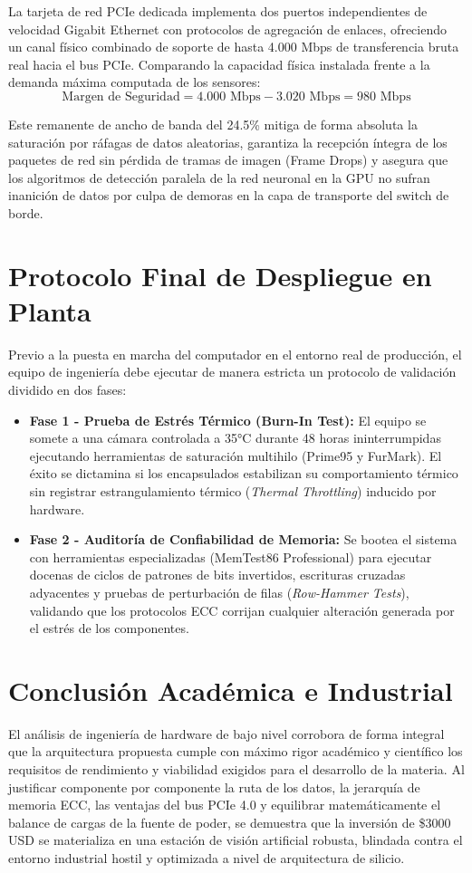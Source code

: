 \documentclass[12pt,letterpaper]{article}
\begin{document}
La tarjeta de red PCIe dedicada implementa dos puertos independientes de velocidad Gigabit Ethernet con protocolos de agregación de enlaces, ofreciendo un canal físico combinado de soporte de hasta 4.000 Mbps de transferencia bruta real hacia el bus PCIe. Comparando la capacidad física instalada frente a la demanda máxima computada de los sensores:
\begin{equation}
\text{Margen de Seguridad} = 4.000 \text{ Mbps} - 3.020 \text{ Mbps} = 980 \text{ Mbps}
\end{equation}

Este remanente de ancho de banda del 24.5\% mitiga de forma absoluta la saturación por ráfagas de datos aleatorias, garantiza la recepción íntegra de los paquetes de red sin pérdida de tramas de imagen (Frame Drops) y asegura que los algoritmos de detección paralela de la red neuronal en la GPU no sufran inanición de datos por culpa de demoras en la capa de transporte del switch de borde.

\section{Protocolo Final de Despliegue en Planta}
Previo a la puesta en marcha del computador en el entorno real de producción, el equipo de ingeniería debe ejecutar de manera estricta un protocolo de validación dividido en dos fases:
\begin{itemize}
    \item \textbf{Fase 1 - Prueba de Estrés Térmico (Burn-In Test):} El equipo se somete a una cámara controlada a 35°C durante 48 horas ininterrumpidas ejecutando herramientas de saturación multihilo (Prime95 y FurMark). El éxito se dictamina si los encapsulados estabilizan su comportamiento térmico sin registrar estrangulamiento térmico (\textit{Thermal Throttling}) inducido por hardware.
    \item \textbf{Fase 2 - Auditoría de Confiabilidad de Memoria:} Se bootea el sistema con herramientas especializadas (MemTest86 Professional) para ejecutar docenas de ciclos de patrones de bits invertidos, escrituras cruzadas adyacentes y pruebas de perturbación de filas (\textit{Row-Hammer Tests}), validando que los protocolos ECC corrijan cualquier alteración generada por el estrés de los componentes.
\end{itemize}

\section{Conclusión Académica e Industrial}
El análisis de ingeniería de hardware de bajo nivel corrobora de forma integral que la arquitectura propuesta cumple con máximo rigor académico y científico los requisitos de rendimiento y viabilidad exigidos para el desarrollo de la materia. Al justificar componente por componente la ruta de los datos, la jerarquía de memoria ECC, las ventajas del bus PCIe 4.0 y equilibrar matemáticamente el balance de cargas de la fuente de poder, se demuestra que la inversión de \$3000 USD se materializa en una estación de visión artificial robusta, blindada contra el entorno industrial hostil y optimizada a nivel de arquitectura de silicio.
\end{document}
